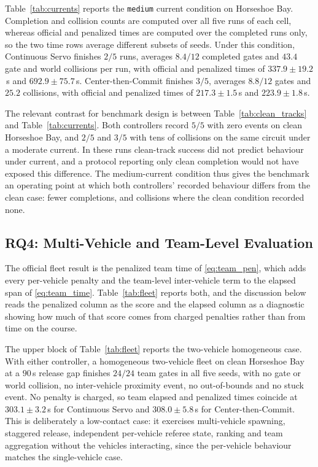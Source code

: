 Table~\ref{tab:currents} reports the \texttt{medium} current condition on
Horseshoe Bay. Completion and collision counts are computed over all five runs
of each cell, whereas official and penalized times are computed over the
completed runs only, so the two time rows average different subsets of seeds.
Under this condition,
Continuous Servo finishes $2/5$ runs, averages $8.4/12$ completed gates and
$43.4$ gate and world collisions per run, with official and penalized times of
$337.9\pm19.2$\,s and $692.9\pm75.7$\,s. Center-then-Commit
finishes $3/5$, averages $8.8/12$ gates and $25.2$ collisions, with official and
penalized times of $217.3\pm1.5$\,s and $223.9\pm1.8$\,s.



The relevant contrast for benchmark design is between
Table~\ref{tab:clean_tracks} and Table~\ref{tab:currents}. Both controllers
record $5/5$ with zero events on clean Horseshoe Bay, and $2/5$ and $3/5$ with
tens of collisions on the same circuit under a moderate current. In these runs
clean-track success did not predict behaviour under current, and a protocol
reporting only clean completion would not have exposed this difference. The
medium-current condition thus gives the benchmark an operating point at which
both controllers' recorded behaviour differs from the clean case: fewer
completions, and collisions where the clean condition recorded none.

\subsection{RQ4: Multi-Vehicle and Team-Level Evaluation}
\label{sec:eval_rq4}



The official fleet result is the penalized team time of \eqref{eq:team_pen},
which adds every per-vehicle penalty and the team-level inter-vehicle term to
the elapsed span of \eqref{eq:team_time}. Table~\ref{tab:fleet} reports both, and
the discussion below reads the penalized column as the score and the elapsed
column as a diagnostic showing how much of that score comes from charged
penalties rather than from time on the course.

The upper block of Table~\ref{tab:fleet} reports the two-vehicle homogeneous
case. With either controller, a homogeneous two-vehicle fleet on clean Horseshoe
Bay at a $90$\,s release gap finishes $24/24$ team gates in all five seeds, with
no gate or world collision, no inter-vehicle proximity event, no out-of-bounds
and no stuck event. No penalty is charged, so team elapsed and penalized times
coincide at $303.1\pm3.2$\,s for Continuous Servo and $308.0\pm5.8$\,s for
Center-then-Commit. This is deliberately a low-contact case: it exercises
multi-vehicle spawning, staggered release, independent per-vehicle referee
state, ranking and team aggregation without the vehicles interacting, since the
per-vehicle behaviour matches the single-vehicle case.

